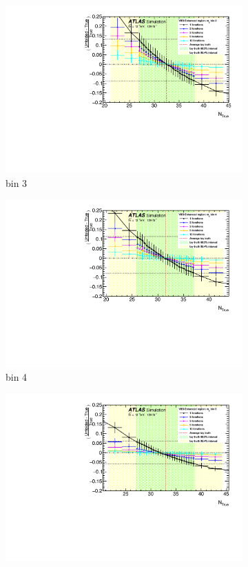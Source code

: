\begin{itemize}
{\begin{figure}[!htb]
\begin{subfigure}{.48\textwidth}
            \includegraphics[width=.9\linewidth]{figures/Analysis/Unfolding/unfoldingbias/unfolding_bias_mjj_VBSEnh_bin3.pdf}
            \caption{ bin 3 }
        \end{subfigure}
        \begin{subfigure}{.48\textwidth}
            \centering
            \includegraphics[width=.9\linewidth]{figures/Analysis/Unfolding/unfoldingbias/unfolding_bias_mjj_VBSEnh_bin4.pdf}
            \caption{bin 4 }
        \end{subfigure}
        \begin{subfigure}{.48\textwidth}
            \centering
            \includegraphics[width=.9\linewidth]{figures/Analysis/Unfolding/unfoldingbias/unfolding_bias_mjj_VBSEnh_bin5.pdf}

\end{subfigure}
\end{figure}}
\end{itemize}
